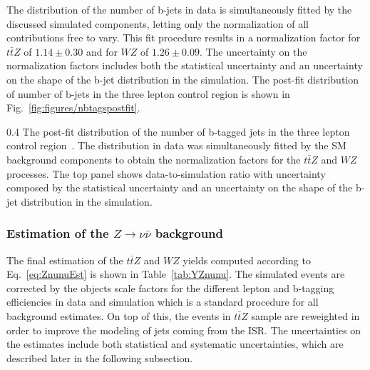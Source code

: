 The distribution of the number of b-jets in data is simultaneously fitted by the discussed simulated components, letting only the normalization of all contributions free to vary. This fit procedure results in a normalization factor for $t\bar{t}Z$ of $1.14 \pm 0.30$ and for $WZ$ of $1.26 \pm 0.09$. The uncertainty on the normalization factors includes both the statistical uncertainty and an uncertainty on the shape of the b-jet distribution in the simulation. The post-fit distribution of number of b-jets in the three lepton control region is shown in Fig.~\ref{fig:figures/nbtagspostfit}.

                 {0.4}       %
                 { The post-fit distribution of the number of b-tagged jets in the three lepton control region~\cite{Sirunyan:2017uyt}. The distribution in data was simultaneously fitted by the SM background components to obtain the normalization factors for the $t\bar{t}Z$ and $WZ$ processes. The top panel shows data-to-simulation ratio with uncertainty composed by the statistical uncertainty and an uncertainty on the shape of the b-jet distribution in the simulation.  }

\subsubsection{Estimation of the $Z \to \nu \bar{\nu}$ background }

The final estimation of the $t\bar{t}Z$ and $WZ$ yields computed according to Eq.~\ref{eq:ZnunuEst} is shown in Table~\ref{tab:YZnunu}. The simulated events are corrected by the objects scale factors for the different lepton and b-tagging efficiencies in data and simulation which is a standard procedure for all background estimates. On top of this, the events in $t\bar{t}Z$ sample are reweighted in order to improve the modeling of jets coming from the ISR. The uncertainties on the estimates include both statistical and systematic uncertainties, which are described later in the following subsection.


